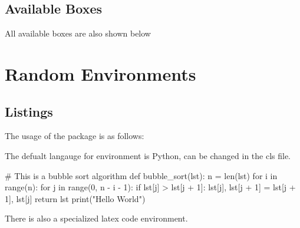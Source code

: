 \documentclass[12pt, sakura, night, 0.5in]{alittlebear}
\begin{document}
\subsection{Available Boxes}

All available boxes are also shown below





\np
\section{Random Environments}

\subsection{Listings}

The usage of the package  is as follows:

The defualt langauge for environment  is Python, can be changed in the cls file.

\begin{code}
    # This is a bubble sort algorithm
    def bubble_sort(lst):
    n = len(lst)
    for i in range(n):
        for j in range(0, n - i - 1):
            if lst[j] > lst[j + 1]:
                lst[j], lst[j + 1] = lst[j + 1], lst[j]
    return lst
    print("Hello World")
\end{code}

There is also a specialized latex code environment.

\begin{latexcode}
\end{latexcode}
\end{document}
